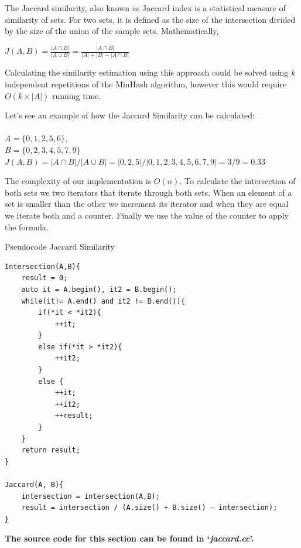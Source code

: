 \documentclass[12pt]{article}
\begin{document}
The Jaccard similarity, also known as Jaccard index is a statistical measure of similarity of sets. For two sets, it is defined as the size of the intersection divided by the size of the union of the sample sets. Mathematically,
\bigbreak
\centerline{\large $J(A,B)=\frac{\left |A\cap B  \right |}{ \left |A\cup B  \right |} = \frac{\left |A\cap B  \right |}{ \left|A\right|+\left|B\right|-\left |A\cap B  \right |} $}
\bigbreak

Calculating the similarity estimation using this approach could be solved using \textit{k} independent repetitions of the MinHash algorithm, however this would require $O(k \times |A|)$ running time. \\\medskip

Let's see an example of how the Jaccard Similarity can be calculated: \\ \\
$A = \{0,1,2,5,6\}$,\\
$B = \{0,2,3,4,5,7,9\}$ \\
$J(A,B) = |A \cap  B| / |A \cup B| = |{0,2,5}| / |{0,1,2,3,4,5,6,7,9}| = 3/9 = 0.33$\\\medskip


The complexity of our implementation is $O(n)$. To calculate the intersection of both sets we two iterators that iterate through both sets. When an element of a set is smaller than the other we increment its iterator and when they are equal we iterate both and a counter. Finally we use the value of the counter to apply the formula. 

\begin{center}
\begin{large}
Pseudocode Jaccard Similarity
\end{large}
\end{center}

\begin{lstlisting}
Intersection(A,B){
	result = 0; 
	auto it = A.begin(), it2 = B.begin();
	while(it!= A.end() and it2 != B.end()){
		if(*it < *it2){
			++it;
		}
		else if(*it > *it2){
			++it2;
		}
		else {
			++it;
			++it2;
			++result;
		}
	}
	return result; 
}

Jaccard(A, B){
	intersection = intersection(A,B);
	result = intersection / (A.size() + B.size() - intersection);
}

\end{lstlisting}

\textbf{The source code for this section can be found in `\textit{jaccard.cc}'.}
\bigskip
\end{document}
